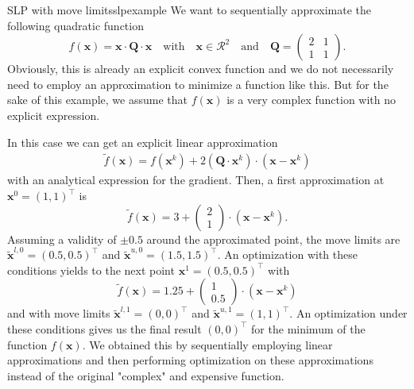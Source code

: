 \begin{example}{SLP with move limits}{slpexample}
    We want to sequentially approximate the following quadratic function
    \begin{equation}
             f(\mathbf{x})= \mathbf{x} \cdot \mathbf{Q} \cdot \mathbf{x} \quad \text{with} \quad \mathbf{x} \in \mathcal{R}^2 \quad \text{and} \quad 
             \mathbf{Q} = 
            \begin{pmatrix}
            2 & 1 \\
            1 & 1 
            \end{pmatrix}. 
    \end{equation}
    Obviously, this is already an explicit convex function and we do not necessarily need to employ an approximation to minimize a function like this. But for the sake of this example, we assume that $f(\mathbf{x})$ is a very complex function with no explicit expression. 
    
    In this case we can get an explicit linear approximation
    \begin{align}
        \tilde{f}(\mathbf{x}) = f(\mathbf{x}^k) + 2(\mathbf{Q} \cdot \mathbf{x}^k) \cdot \left(\mathbf{x} - \mathbf{x}^k \right)
    \end{align}
    with an analytical expression for the gradient. Then, a first approximation at $\mathbf{x}^0=(1,1)^\top$ is 
    \begin{equation}
        \tilde{f}(\mathbf{x}) = 3 + \begin{pmatrix} 2\\1 \end{pmatrix} \cdot \left(\mathbf{x} - \mathbf{x}^k \right).
    \end{equation}
    Assuming a validity of $\pm 0.5$ around the approximated point, the move limits are $\tilde{\mathbf{x}}^{l,0}=(0.5, 0.5)^\top$ and  $\tilde{\mathbf{x}}^{u,0}=(1.5, 1.5)^\top$.  
    An optimization with these conditions yields to the next point $\mathbf{x}^1=(0.5,0.5)^\top$ with 
    \begin{equation}
        \tilde{f}(\mathbf{x}) = 1.25 + \begin{pmatrix} 1\\0.5 \end{pmatrix} \cdot \left(\mathbf{x} - \mathbf{x}^k \right)
    \end{equation}
    and with move limits $\tilde{\mathbf{x}}^{l,1}=(0, 0)^\top$ and  $\tilde{\mathbf{x}}^{u,1}=(1, 1)^\top$. 
    An optimization under these conditions gives us the final result $(0,0)^\top$ for the minimum of the function $f(\mathbf{x})$. We obtained this by sequentially employing linear approximations and then performing optimization on these approximations instead of the original "complex" and expensive function.
\end{example}


